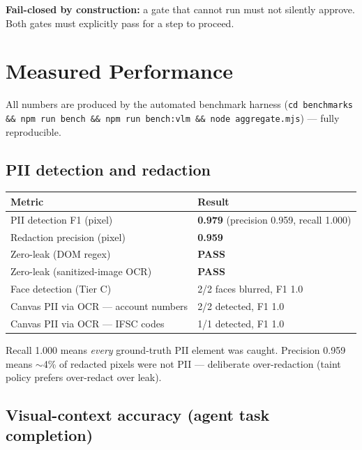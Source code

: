 \documentclass[11pt,a4paper]{article}
\newcommand{\code}[1]{\texttt{#1}}
\renewcommand{\arraystretch}{1.25}
\begin{document}
\begin{itemize}
\textbf{Fail-closed by construction:} a gate that cannot run must not silently approve. Both gates must explicitly pass for a step to proceed.

\section{Measured Performance}

All numbers are produced by the automated benchmark harness (\code{cd benchmarks \&\& npm run bench \&\& npm run bench:vlm \&\& node aggregate.mjs}) --- fully reproducible.

\subsection{PII detection and redaction}

\begin{table}[H]
\small
\renewcommand{\arraystretch}{1.3}
\begin{tabularx}{\linewidth}{@{}lX@{}}
\toprule
\textbf{Metric} & \textbf{Result} \\
\midrule
PII detection F1 (pixel) & \textbf{0.979} (precision 0.959, recall 1.000) \\
Redaction precision (pixel) & \textbf{0.959} \\
Zero-leak (DOM regex) & \textbf{PASS} \\
Zero-leak (sanitized-image OCR) & \textbf{PASS} \\
Face detection (Tier C) & 2/2 faces blurred, F1 1.0 \\
Canvas PII via OCR --- account numbers & 2/2 detected, F1 1.0 \\
Canvas PII via OCR --- IFSC codes & 1/1 detected, F1 1.0 \\
\bottomrule
\end{tabularx}
\end{table}

Recall 1.000 means \emph{every} ground-truth PII element was caught. Precision 0.959 means $\sim$4\% of redacted pixels were not PII --- deliberate over-redaction (taint policy prefers over-redact over leak).

\subsection{Visual-context accuracy (agent task completion)}


\end{itemize}
\end{document}
